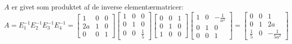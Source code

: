 \documentclass[a4paper,12pt]{article}
\begin{document}
$A$ er givet som produktet af de inverse elementærmatricer:\\
\[
A = E^{-1}_1E^{-1}_2E^{-1}_3E^{-1}_4 = 
\left[\begin{array}{ccc}
    1 & 0 & 0 \\
    2a & 1 & 0 \\
    0 & 0 & 1
\end{array}\right]
\left[\begin{array}{ccc}
    1 & 0 & 0 \\
    0 & 1 & 0 \\
    0 & 0 & \frac{1}{5}
\end{array}\right]
\left[\begin{array}{ccc}
    0 & 0 & 1 \\
    0 & 1 & 0 \\
    1 & 0 & 0
\end{array}\right]
\left[\begin{array}{ccc}
    1 & 0 & -\frac{1}{a^2} \\
    0 & 1 & 0 \\
    0 & 0 & 1
\end{array}\right]
=
\left[\begin{array}{ccc}
    0 & 0 & 1 \\
    0 & 1 & 2a \\
    \frac{1}{5} & 0 & -\frac{1}{5a^2}
\end{array}\right]
\]
\end{document}
